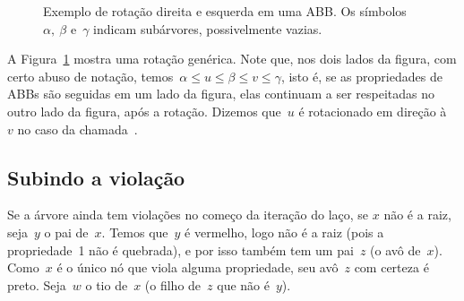\documentclass[main.tex]{subfiles}
\begin{document}
\begin{figure}
\centering
{}
\caption{Exemplo de rotação direita e esquerda em uma ABB. Os símbolos~$\alpha,~\beta$ e~$\gamma$ indicam subárvores, possivelmente vazias.} \label{fig:rot_ex}
\end{figure}

A Figura~\ref{fig:rot_ex} mostra uma rotação genérica. Note que, nos dois lados da figura, com certo abuso de notação, temos~${\alpha \leq u \leq \beta \leq v \leq \gamma}$, isto é, se as propriedades de ABBs são seguidas em um lado da figura, elas continuam a ser respeitadas no outro lado da figura, após a rotação. Dizemos que~$u$ é rotacionado em direção à~$v$ no caso da chamada~. %

\subsection{Subindo a violação}

Se a árvore ainda tem violações no começo da iteração do laço, se $x$ não é a raiz, seja~$y$ o pai de~$x$. Temos que~$y$ é vermelho, logo não é a raiz (pois a propriedade~1 não é quebrada), e por isso também tem um pai~$z$ (o avô de~$x$). Como~$x$ é o único nó que viola alguma propriedade, seu avô~$z$ com certeza é preto. Seja~$w$ o tio de~$x$ (o filho de~$z$ que não é~$y$).
\end{document}
